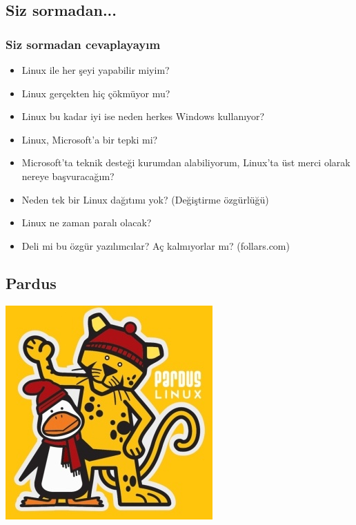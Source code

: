 \documentclass{beamer}
\begin{document}
	\subsection{Siz sormadan...}
	\begin{frame}
	 	\frametitle{Siz sormadan cevaplayayım}
		\begin{itemize}[<+->]
			\item Linux ile her şeyi yapabilir miyim?
			\item Linux gerçekten hiç çökmüyor mu?
			\item Linux bu kadar iyi ise neden herkes Windows kullanıyor?
			\item Linux, Microsoft'a bir tepki mi?
			\item Microsoft'ta teknik desteği kurumdan alabiliyorum, Linux'ta üst merci olarak nereye başvuracağım?
			\item Neden tek bir Linux dağıtımı yok? (Değiştirme özgürlüğü)
			\item Linux ne zaman paralı olacak?
			\item Deli mi bu özgür yazılımcılar? Aç kalmıyorlar mı? (follars.com)
		\end{itemize}

	\end{frame}
	
	\subsection{Pardus}
	\begin{frame}
	 \includegraphics{pardus.jpg}
	\end{frame}
\end{document}
